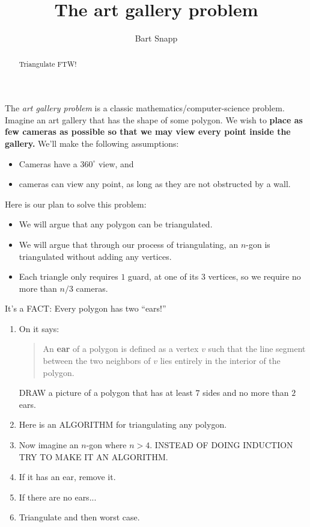 \documentclass[nooutcomes,noauthor,hints]{ximera}
\title{The art gallery problem}
\author{Bart Snapp}
\begin{document}
\begin{abstract}
  Triangulate FTW!
\end{abstract}
\maketitle


\begin{listOutcomes}
\item 
\item 
\item 
\end{listOutcomes}

The \textit{art gallery problem} is a classic
mathematics/computer-science problem.  Imagine an art gallery that has
the shape of some polygon. We wish to \textbf{place as few cameras as
  possible so that we may view every point inside the gallery.} We'll
make the following assumptions:
\begin{itemize}
\item Cameras have a $360^\circ$ view, and
\item cameras can view any point, as long as they are not obstructed
    by a wall.
\end{itemize}
Here is our plan to solve this problem:
\begin{itemize}
\item We will argue that any polygon can be triangulated.
\item We will argue that through our process of triangulating, an
  $n$-gon is triangulated without adding any vertices.
\item Each triangle only requires $1$ guard, at one of its $3$
  vertices, so we require no more than $n/3$ cameras.
\end{itemize}

\mynewpage


\begin{question}%
  It's a FACT: Every polygon has two ``ears!''
  \begin{enumerate}
    \item On
      it says:
      \begin{quote}
        An \textbf{ear} of a polygon is defined as a vertex $v$ such that the
        line segment between the two neighbors of $v$ lies entirely in
        the interior of the polygon.
      \end{quote}
      DRAW a picture of a polygon that has at least $7$ sides and no
      more than $2$ ears.
    \item Here is an ALGORITHM for triangulating any polygon.
    \item Now imagine an $n$-gon where $n> 4$. INSTEAD OF DOING INDUCTION TRY TO MAKE IT AN ALGORITHM.
    \item If it has an ear, remove it.
    \item If there are no ears...
      \item Triangulate and then worst case. 
  \end{enumerate}
  
  
\end{question}
\end{document}
